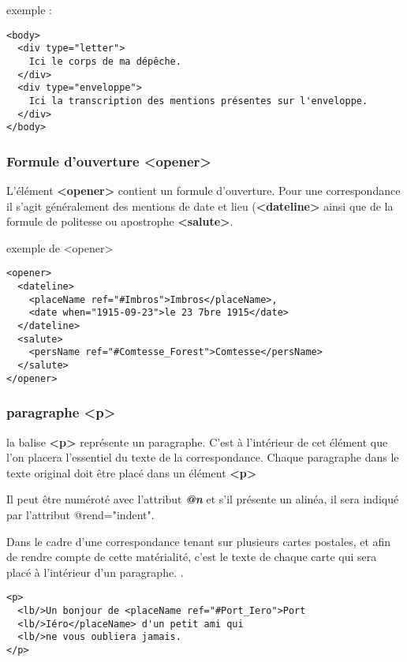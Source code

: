 \documentclass[18pt,a4paper,oneside]{book} %
\begin{document}
exemple : 
\begin{lstlisting}
<body>
  <div type="letter">
    Ici le corps de ma dépêche.
  </div>
  <div type="enveloppe">
    Ici la transcription des mentions présentes sur l'enveloppe. 
  </div>
</body>
\end{lstlisting}

\subsubsection{Formule d'ouverture <opener>}

L'élément \textbf{<opener>} contient un formule d'ouverture. Pour une correspondance il s'agit généralement des mentions de date et lieu (\textbf{<dateline>} ainsi que de la formule de politesse ou apostrophe \textbf{<salute>}.
\bigskip 

exemple de <opener>
\begin{lstlisting}
<opener>               
  <dateline>
    <placeName ref="#Imbros">Imbros</placeName>,
    <date when="1915-09-23">le 23 7bre 1915</date>
  </dateline>                
  <salute>
    <persName ref="#Comtesse_Forest">Comtesse</persName>
  </salute>
</opener>
\end{lstlisting}
 
\subsubsection{paragraphe <p>}

la balise \textbf{<p>} représente un paragraphe. C'est à l'intérieur de cet élément que l'on placera l'essentiel du texte de la correspondance. Chaque paragraphe dans le texte original doit être placé dans un élément \textbf{<p>}

Il peut être numéroté avec l'attribut \textbf{\textit{@n}} et s'il présente un alinéa, il sera indiqué par l'attribut @rend="indent".

Dans le cadre d'une correspondance tenant sur plusieurs cartes postales, et afin de rendre compte de cette matérialité,  c'est le texte de chaque carte qui sera placé à l'intérieur d'un paragraphe.
.

\begin{lstlisting}
<p>
  <lb/>Un bonjour de <placeName ref="#Port_Iero">Port
  <lb/>Iéro</placeName> d'un petit ami qui 
  <lb/>ne vous oubliera jamais.
</p>
\end{lstlisting}
\end{document}
